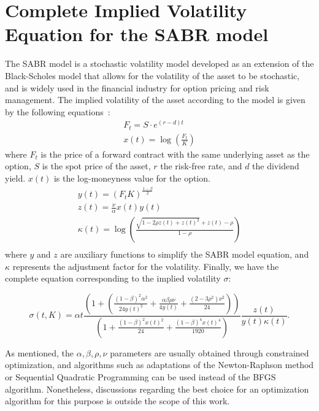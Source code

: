 \appendices


\section{Complete Implied Volatility Equation for the SABR model}
\label{sec:sabr}

The SABR model is a stochastic volatility model developed as an extension of the Black-Scholes
model that allows for the volatility of the asset to be stochastic,
and is widely used in the financial industry for option pricing and risk management.
The implied volatility of the asset according to the model is given by the following equations~\citep{Hagan2002}:
\begin{equation*}
    \begin{aligned}
        F_t = S \cdot e^{(r - d)t}\\
        x(t) = \log \left( \frac{F_t}{K} \right)
    \end{aligned}
\end{equation*}
where $F_t$ is the price of a forward contract with the same underlying asset as the option,
$S$ is the spot price of the asset, $r$ the risk-free rate, and $d$ the dividend yield.
$x(t)$ is the log-moneyness value for the option.
\begin{gather*}
    y(t) = \left(F_t K\right)^{\frac{1 - \beta}{2}}\\
    z(t) = \frac{\nu}{\alpha}x(t) y(t)\\
    \kappa (t) = \log \left( \frac{\sqrt{1 - 2 \rho z(t) + z(t)^2} + z(t) - \rho}{1 - \rho} \right)\\
\end{gather*}
where $y$ and $z$ are auxiliary functions to simplify the SABR model equation,
and $\kappa$ represents the adjustment factor for the volatility.
Finally, we have the complete equation corresponding to the implied volatility $\sigma$:

\begin{equation*}
    \sigma (t, K) = \alpha t
    \frac{
        \left( 1 + \left( \frac{(1 - \beta)^2 \alpha^2}{24 y(t)^2} + \frac{\alpha \beta \rho \nu }{4 y(t)} + \frac{(2 - 3 \rho^2) \nu^2}{24} \right) \right)
    } {
        \left( 1 + \frac{(1 - \beta)^2 x(t)^2}{24} + \frac{(1 - \beta)^4 x(t)^4}{1920} \right)
    } \frac{z(t)}{y(t)\kappa (t)}.
\end{equation*}

As mentioned, the $\alpha, \beta, \rho, \nu$ parameters are usually obtained through constrained optimization,
and algorithms such as adaptations of the Newton-Raphson method or Sequential Quadratic Programming can be used instead of the BFGS algorithm.
Nonetheless, discussions regarding the best choice for an optimization algorithm for this purpose is outside the scope of this work.
